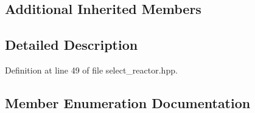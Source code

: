 \subsection*{Additional Inherited Members}


\subsection{Detailed Description}


Definition at line 49 of file select\+\_\+reactor.\+hpp.



\subsection{Member Enumeration Documentation}
\hypertarget{classasio_1_1detail_1_1select__reactor_aa68ba3d214f9f046a27ad6b4ad743b37}{}
